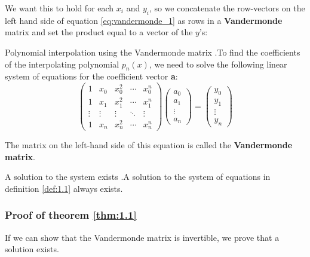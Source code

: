 \documentclass[12pt,letterpaper]{article}
\begin{document}
We want this to hold for each $x_i$ and $y_i$, so we concatenate the row-vectors on the left hand side of equation \ref{eq:vandermonde_1} as rows in a \textbf{Vandermonde} matrix and set the product equal to a vector of the $y$'s:
\begin{defn}{Polynomial interpolation using the Vandermonde matrix}
.To find the coefficients of the interpolating polynomial $p_n(x)$, we need to solve the following linear system of equations for the coefficient vector \textbf{a}:
\begin{equation}
\begin{pmatrix}
	1 & x_0 & x_0^2 & \cdots & x_0^n \\
	1 & x_1 & x_1^2 & \cdots & x_1^n \\
	\vdots & \vdots & \vdots & \ddots & \vdots \\
	1 & x_n & x_n^2 & \cdots & x_n^n
\end{pmatrix}
\begin{pmatrix}
	a_0 \\ a_1 \\ \vdots \\ a_n
\end{pmatrix} =
\begin{pmatrix}
	y_0 \\ y_1 \\ \vdots \\ y_n
\end{pmatrix}
\end{equation}

The matrix on the left-hand side of this equation is called the \textbf{Vandermonde matrix}.
\label{def:1.1}
\end{defn}

\begin{theo}{A solution to the system exists}
.A solution to the system of equations in definition \ref{def:1.1} always exists.
\label{thm:1.1}
\end{theo}

\subsubsection*{Proof of theorem \ref{thm:1.1}}

If we can show that the Vandermonde matrix is invertible, we prove that a solution exists.
\end{document}
